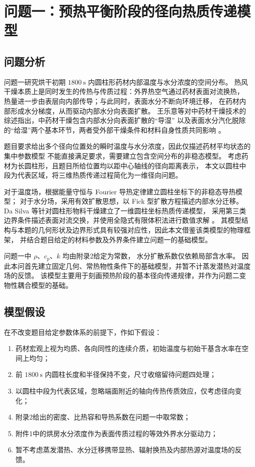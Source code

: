 \documentclass[UTF8,a4paper,12pt]{ctexart}
\begin{document}
\section{问题一：预热平衡阶段的径向热质传递模型}

\subsection{问题分析}

问题一研究烘干初期 $1800~\mathrm{s}$ 内圆柱形药材内部温度与水分浓度的空间分布。
热风干燥本质上是同时发生的传热与传质过程：外界热空气通过药材表面对流换热，
热量进一步由表层向内部传导；与此同时，表面水分不断向环境迁移，
在药材内部形成水分梯度，从而驱动内部水分向表面扩散。
王乐意等对中药材干燥技术的综述指出，中药材干燥包含内部水分向表面扩散的“导湿”
以及表面水分汽化脱除的“给湿”两个基本环节，两者受外部干燥条件和材料自身性质共同影响
\cite{wang2024}。

题目要求给出多个径向位置处的瞬时温度与水分浓度，因此仅描述药材平均状态的集中参数模型
不能直接满足要求，需要建立包含空间分布的非稳态模型。
考虑药材为长圆柱形，且题目所给位置均以距中心轴线的径向距离表示，
本文以圆柱中段为代表区域，将三维热质传递过程简化为一维径向问题。

对于温度场，根据能量守恒与 Fourier 导热定律建立圆柱坐标下的非稳态导热模型；
对于水分场，采用有效扩散思想，以 Fick 型扩散方程描述内部水分迁移。
Da Silva 等针对圆柱形物料干燥建立了一维圆柱坐标热质传递模型，
采用第三类边界条件描述表面对流交换，并使用全隐式有限体积法进行数值求解
\cite{dasilva2014}。
其模型结构与本题的几何形状及边界形式具有较强对应性，因此本文借鉴该类模型的物理框架，
并结合题目给定的材料参数及外界条件建立问题一的基础模型。

问题一中 $\rho$、$c_p$、$k$ 均由附录2给定为常数，
水分扩散系数仅依赖局部含水率。
因此本问首先建立固定几何、常热物性条件下的基础模型，并暂不计蒸发潜热对温度场的反馈。
该模型主要用于刻画预热阶段的基本径向传递规律，并作为问题二变物性耦合模型的基础。

\subsection{模型假设}

在不改变题目给定参数体系的前提下，作如下假设：

\begin{enumerate}
    \item 药材宏观上视为均质、各向同性的连续介质，初始温度与初始干基含水率在空间上均匀；
    \item 前 $1800~\mathrm{s}$ 内圆柱长度和半径保持不变，尺寸收缩留待问题四处理；
    \item 以圆柱中段为代表区域，忽略端面附近的轴向传热传质效应，仅考虑径向变化；
    \item 附录2给出的密度、比热容和导热系数在问题一中取常数；
    \item 附件1中的烘房水分浓度作为表面传质过程的等效外界水分驱动力；
    \item 暂不考虑蒸发潜热、水分迁移携带显热、辐射换热及内部热源对温度场的反馈。
\end{enumerate}
\end{document}
